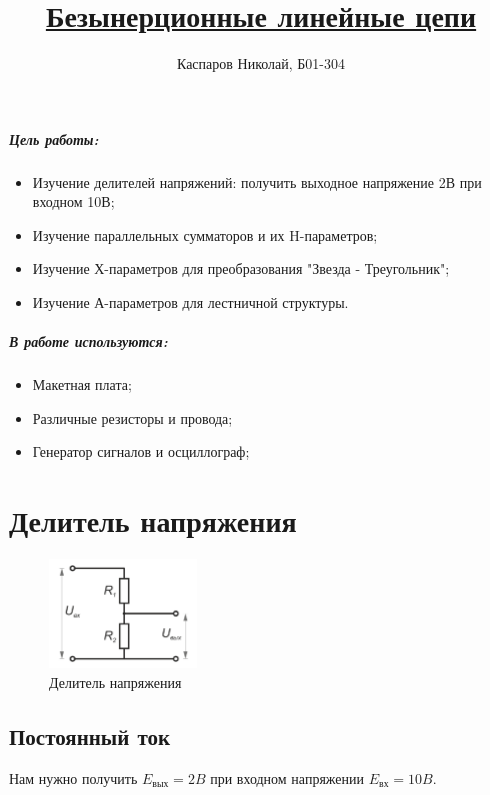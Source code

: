 \documentclass[a4paper]{article}
\title{\underline{Безынерционные линейные цепи}}
\author{Каспаров Николай, Б01-304}
\begin{document}
\maketitle
\begin{center}
\Large{\textbf{ }}
\end{center}

\subparagraph{Цель работы:}

\begin{itemize}
    \item Изучение делителей напряжений: получить выходное напряжение 2В при входном 10В;
    \item Изучение параллельных сумматоров и их H-параметров;
    \item Изучение Х-параметров для преобразования "Звезда - Треугольник";
    \item Изучение А-параметров для лестничной структуры.
\end{itemize}

\subparagraph{В работе используются:}

\begin{itemize}
    \item Макетная плата;
    \item Различные резисторы и провода;
    \item Генератор сигналов и осциллограф;
\end{itemize}

\section{Делитель напряжения}

\begin{figure}
    \includegraphics[width = 0.35\textwidth]{splitter.png}
    \caption[width = 0.95\textwidth]{Делитель напряжения}
\end{figure}

\subsection{Постоянный ток}

Нам нужно получить $E_\text{вых} = 2B$ при входном напряжении $E_\text{вх} = 10B$.
\end{document}
